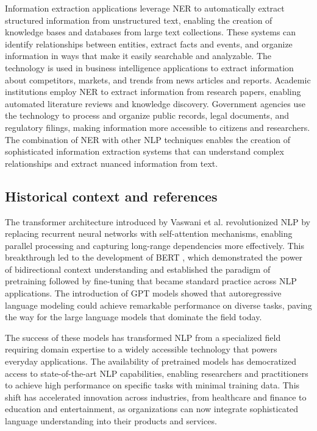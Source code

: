 Information extraction applications leverage NER to automatically extract structured information from unstructured text, enabling the creation of knowledge bases and databases from large text collections. These systems can identify relationships between entities, extract facts and events, and organize information in ways that make it easily searchable and analyzable. The technology is used in business intelligence applications to extract information about competitors, markets, and trends from news articles and reports. Academic institutions employ NER to extract information from research papers, enabling automated literature reviews and knowledge discovery. Government agencies use the technology to process and organize public records, legal documents, and regulatory filings, making information more accessible to citizens and researchers. The combination of NER with other NLP techniques enables the creation of sophisticated information extraction systems that can understand complex relationships and extract nuanced information from text.

\subsection{Historical context and references}

The transformer architecture introduced by Vaswani et al. \textcite{Vaswani2017} revolutionized NLP by replacing recurrent neural networks with self-attention mechanisms, enabling parallel processing and capturing long-range dependencies more effectively. This breakthrough led to the development of BERT \textcite{Devlin2018}, which demonstrated the power of bidirectional context understanding and established the paradigm of pretraining followed by fine-tuning that became standard practice across NLP applications. The introduction of GPT models \textcite{Radford2019} showed that autoregressive language modeling could achieve remarkable performance on diverse tasks, paving the way for the large language models that dominate the field today.

The success of these models has transformed NLP from a specialized field requiring domain expertise to a widely accessible technology that powers everyday applications. The availability of pretrained models has democratized access to state-of-the-art NLP capabilities, enabling researchers and practitioners to achieve high performance on specific tasks with minimal training data. This shift has accelerated innovation across industries, from healthcare and finance to education and entertainment, as organizations can now integrate sophisticated language understanding into their products and services.

